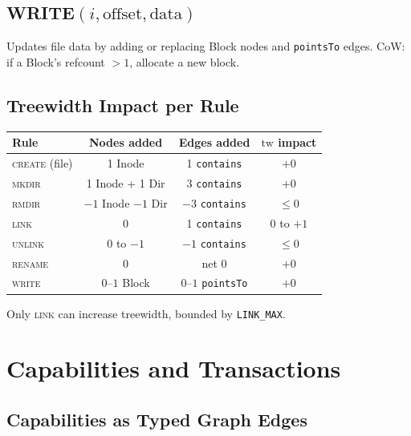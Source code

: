 \documentclass[11pt,a4paper]{article}
\theoremstyle{definition}
\newcommand{\tw}{\ensuremath{\mathrm{tw}}}
\begin{document}
\subsection{WRITE$(i, \mathrm{offset}, \mathrm{data})$}

Updates file data by adding or replacing Block nodes and \texttt{pointsTo}
edges. CoW: if a Block's refcount $> 1$, allocate a new block.

\subsection{Treewidth Impact per Rule}

\begin{center}
\footnotesize
\begin{tabular}{lccc}
\toprule
\textbf{Rule} & \textbf{Nodes added} & \textbf{Edges added} & \textbf{$\tw$ impact} \\
\midrule
\textsc{create} (file) & 1 Inode & 1 \texttt{contains} & $+0$ \\
\textsc{mkdir} & 1 Inode + 1 Dir & 3 \texttt{contains} & $+0$ \\
\textsc{rmdir} & $-1$ Inode $-1$ Dir & $-3$ \texttt{contains} & $\le 0$ \\
\textsc{link} & 0 & 1 \texttt{contains} & $0$ to $+1$ \\
\textsc{unlink} & $0$ to $-1$ & $-1$ \texttt{contains} & $\le 0$ \\
\textsc{rename} & 0 & net 0 & $+0$ \\
\textsc{write} & $0$--$1$ Block & $0$--$1$ \texttt{pointsTo} & $+0$ \\
\bottomrule
\end{tabular}
\end{center}

Only \textsc{link} can increase treewidth, bounded by \texttt{LINK\_MAX}.

\section{Capabilities and Transactions}\label{sec:transactions}

\subsection{Capabilities as Typed Graph Edges}
\end{document}
